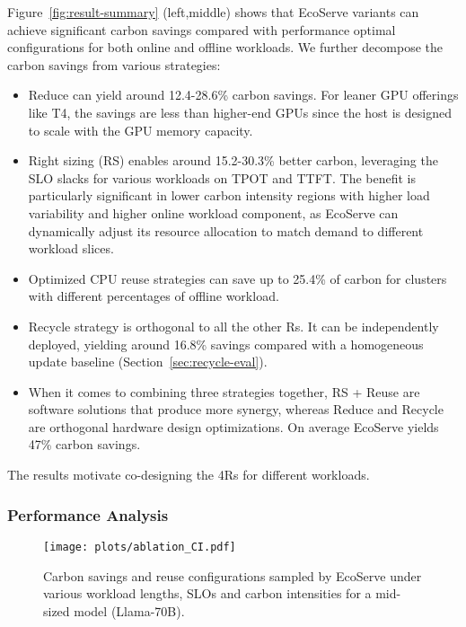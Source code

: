 Figure~\ref{fig:result-summary} (left,middle) shows that EcoServe variants can achieve significant carbon savings compared with performance optimal configurations for both online and offline workloads. We further decompose the carbon savings from various strategies: 



\begin{itemize}[leftmargin=*]
    \item Reduce can yield around 12.4-28.6\% carbon savings. For leaner GPU offerings like T4, the savings are less than higher-end GPUs since the host is designed to scale with the GPU memory capacity.  
    \item Right sizing (RS) enables around 15.2-30.3\% better carbon, leveraging the SLO slacks for various workloads on TPOT and TTFT. The benefit is particularly significant in lower carbon intensity regions with higher load variability and higher online workload component, as EcoServe can dynamically adjust its resource allocation to match demand to different workload slices. 

    \item Optimized CPU reuse strategies can save up to 25.4\% of carbon for clusters with different percentages of offline workload. 
    \item Recycle strategy is orthogonal to all the other Rs. It can be independently deployed, yielding around 16.8\% savings compared with a homogeneous update baseline (Section~\ref{sec:recycle-eval}).
    \item When it comes to combining three strategies together, RS + Reuse are software solutions that produce more synergy, whereas Reduce and Recycle are orthogonal hardware design optimizations. On average EcoServe yields 47\% carbon savings. 
\end{itemize}
The results motivate co-designing the 4Rs for different workloads. 
\subsubsection{Performance Analysis}
\begin{figure}
    \centering
    \texttt{[image: plots/ablation\_CI.pdf]}\vspace{-0.23in}
    \caption{Carbon savings and reuse configurations sampled by EcoServe under various workload lengths, SLOs and carbon intensities for a mid-sized model (Llama-70B). }
    \label{fig:ablation}
\end{figure}

